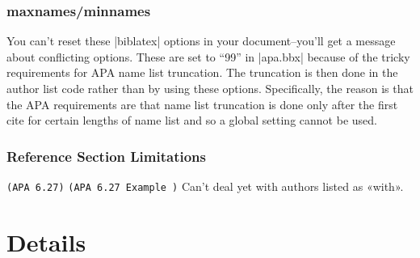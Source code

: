 \documentclass{ltxdockit}
\newcommand\apa[2][]{\ifthenelse{\equal{#1}{}}%
                       {\texttt{(APA #2)}}%
                       {\texttt{(APA #2 Example #1)}}}
\begin{document}
\subsubsection{maxnames/minnames}

You can't reset these |biblatex| options in your document--you'll get a
message about conflicting options. These are set to ``99'' in |apa.bbx|
because of the tricky requirements for APA name list truncation. The
truncation is then done in the author list code rather than by using these
options. Specifically, the reason is that the APA requirements are that
name list truncation is done only after the first cite for certain lengths
of name list and so a global setting cannot be used.

\subsubsection{Reference Section Limitations}

\begin{description}
\item\apa{6.27} Can't deal yet with authors listed as «with».
\end{description}

\section{Details}
\end{document}
